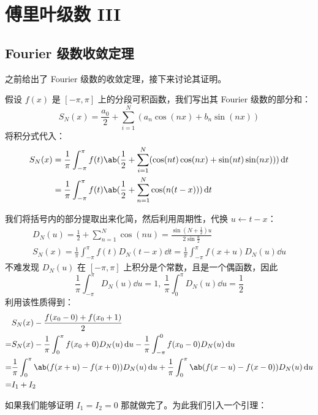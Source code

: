 \section{傅里叶级数 III}

\subsection{Fourier 级数收敛定理}

之前给出了 Fourier 级数的收敛定理，接下来讨论其证明。

假设 $f(x)$ 是 $[-\pi, \pi]$ 上的分段可积函数，我们写出其 Fourier 级数的部分和：
$$
S_N(x) = \frac{a_0}{2} + \sum_{i = 1}^{N} (a_n \cos (n x) + b_n \sin (n x))
$$
将积分式代入：
$$
\begin{aligned}
    S_N(x) & = \frac{1}{\pi} \int_{-\pi}^{\pi} f(t) \ab(\frac{1}{2} + \sum_{i = 1}^{N} (\cos (n t) \cos (n x) + \sin (n t) \sin (n x))) \dd{t} \\
    & = \frac{1}{\pi} \int_{-\pi}^{\pi} f(t) \ab(\frac{1}{2} + \sum_{n = 1}^{N} \cos (n (t - x))) \dd{t}
\end{aligned}
$$

我们将括号内的部分提取出来化简，然后利用周期性，代换 $u \gets t - x$：
$$
\begin{gathered}
    D_N(u) = \frac{1}{2} + \sum_{n = 1}^{N} \cos (n u) = \frac{\sin (N + \frac{1}{2}) u}{2 \sin \frac{u}{2}} \\
    S_N(x) = \frac{1}{\pi} \int_{-\pi}^{\pi} f(t) D_N(t - x) \dd{t} = \frac{1}{\pi} \int_{-\pi}^{\pi} f(x + u) D_N(u) \dd{u}
\end{gathered}
$$
不难发现 $D_N(u)$ 在 $[-\pi, \pi]$ 上积分是个常数，且是一个偶函数，因此
$$
\frac{1}{\pi} \int_{-\pi}^{\pi} D_N(u) \dd{u} = 1,\ \frac{1}{\pi} \int_{0}^{\pi} D_N(u) \dd{u} = \frac{1}{2}
$$
利用该性质得到：
$$
\begin{aligned}
    & S_N(x) - \frac{f(x_0 - 0) + f(x_0 + 1)}{2} \\
    = & S_N(x) - \frac{1}{\pi} \int_{0}^{\pi} f(x_0 + 0) D_N(u) \dd{u} - \frac{1}{\pi} \int_{-\pi}^{0} f(x_0 - 0) D_N(u) \dd{u} \\
    = & \frac{1}{\pi} \int_{0}^{\pi} \ab(f(x + u) - f(x + 0)) D_N(u) \dd{u} + \frac{1}{\pi} \int_{0}^{\pi} \ab(f(x - u) - f(x - 0)) D_N(u) \dd{u} \\
    = & I_1 + I_2
\end{aligned}
$$

如果我们能够证明 $I_1 = I_2 = 0$ 那就做完了。为此我们引入一个引理：

